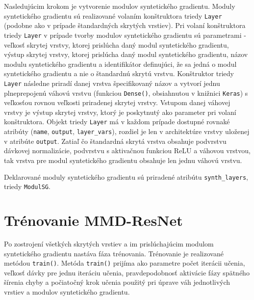 Nasledujúcim krokom je vytvorenie modulov syntetického gradientu. Moduly syntetického gradientu sú realizované volaním konštruktora triedy \texttt{Layer} (podobne ako v prípade štandardných skrytých vrstiev). Pri volaní konštruktora triedy \texttt{Layer} v prípade tvorby modulov syntetického gradientu sú parametrami - veľkosť skrytej vrstvy, ktorej prislúcha daný modul syntetického gradientu, výstup skrytej vrstvy, ktorej prislúcha daný modul syntetického gradientu, názov modulu syntetického gradientu a identifikátor definujúci, že sa jedná o modul syntetického gradientu a nie o štandardnú skrytú vrstvu. Konštruktor triedy \texttt{Layer} následne priradí danej vrstva špecifikovaný názov a vytvorí jednu plneprepojenú váhovú vrstvu (funkciou \texttt{Dense()}, obsiahnutou v knižnici \texttt{Keras}) s veľkosťou rovnou veľkosti priradenej skrytej vrstvy. Vstupom danej váhovej vrstvy je výstup skrytej vrstvy, ktorý je poskytnutý ako parameter pri volaní konštruktora. Objekt triedy \texttt{Layer} má v každom prípade dostupné rovnaké atribúty (\texttt{name}, \texttt{output}, \texttt{layer_vars}), rozdiel je len v architektúre vrstvy uloženej v atribúte \texttt{output}. Zatiaľ čo štandardná skrytá vrstva obsahuje podvrstvu dávkovej normalizácie, podvrstvu s aktivačnou funkciou ReLU a váhovou vrstvou, tak vrstva pre modul syntetického gradientu obsahuje len jednu váhovú vrstvu.

Deklarované moduly syntetického gradientu sú priradené atribútu \texttt{synth_layers}, triedy \texttt{ModulSG}.

\section{Trénovanie MMD-ResNet}
\label{implementacia_trenovania_MMD_ResNet}

Po zostrojení všetkých skrytých vrstiev a im prislúchajúcim modulom syntetického gradientu nastáva fáza trénovania. Trénovanie je realizované metódou \texttt{train()}. Metóda \texttt{train()} prijíma ako parametre počet iterácii učenia, veľkosť dávky pre jednu iteráciu učenia, pravdepodobnosť aktivácie fázy spätného šírenia chyby a počiatočný krok učenia použitý pri úprave váh jednotlivých vrstiev a modulov syntetického gradientu.

